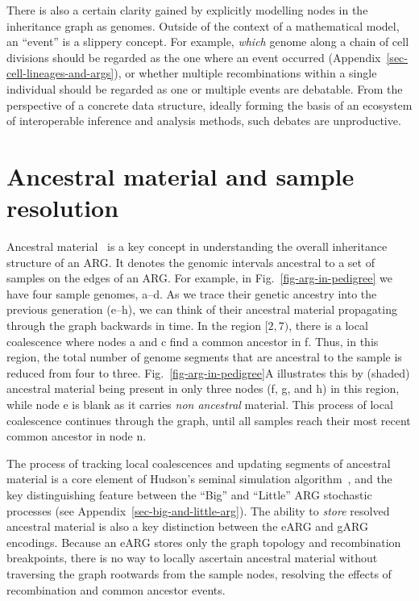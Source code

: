 \documentclass{article}
\newcommand{\noderef}[1]{\textsf{#1}}
\begin{document}
There is also a certain clarity gained by explicitly modelling nodes
in the inheritance graph as genomes.
Outside of the context of a
mathematical model, an ``event'' is a slippery concept.
For example, \emph{which} genome along a chain of cell divisions should be
regarded as the one where an event occurred
(Appendix~\ref{sec-cell-lineages-and-args}),
or whether multiple recombinations
within a single individual should be regarded as one or multiple events are
debatable.
From the perspective of a concrete data structure,
ideally forming the basis of an ecosystem of interoperable
inference and analysis methods, such debates
are unproductive.

\section{Ancestral material and sample resolution}
\label{sec-ancestral-material}
Ancestral material~\citep{wiuf1999ancestry,wiuf1999recombination}
is a key concept in understanding the overall inheritance structure
of an ARG. It denotes the genomic intervals ancestral to a set of samples
on the edges of an ARG.
For example, in Fig.~\ref{fig-arg-in-pedigree} we have
four sample genomes, \noderef{a}--\noderef{d}. As we
trace their genetic ancestry into the previous generation
(\noderef{e}--\noderef{h}), we can think of their ancestral
material propagating through the graph
backwards in time. In the region $[2, 7)$, there is a
local coalescence where nodes \noderef{a} and \noderef{c}
find a common ancestor in \noderef{f}. Thus, in this region,
the total number of genome segments that are ancestral to the
sample is reduced from four to three. Fig.~\ref{fig-arg-in-pedigree}A
illustrates this by (shaded) ancestral material being present
in only three nodes (\noderef{f}, \noderef{g}, and \noderef{h}) in this region,
while node \noderef{e} is blank
as it carries \emph{non ancestral} material.
This process of local coalescence continues through the
graph, until all samples reach their most recent common
ancestor in node \noderef{n}.

The process of tracking local coalescences and updating
segments of ancestral material is a core element of
Hudson's seminal simulation
algorithm~\citep{hudson1983testing,kelleher2016efficient},
and the key distinguishing feature between the
``Big'' and ``Little'' ARG stochastic processes
(see Appendix~\ref{sec-big-and-little-arg}).
The ability to \emph{store} resolved ancestral material
is also a key distinction between the eARG and gARG
encodings. Because an eARG stores only the graph topology and
recombination breakpoints, there is no way to locally
ascertain ancestral material without traversing the graph
rootwards from the sample nodes,
resolving the effects of recombination and common ancestor events.
\end{document}
